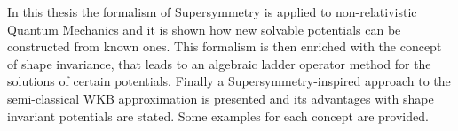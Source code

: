 \thispagestyle{intro}
In this thesis the formalism of Supersymmetry is applied to non-relativistic
Quantum Mechanics and it is shown how new solvable potentials can be
constructed from known ones. This formalism is then enriched with the concept
of shape invariance, that leads to an algebraic ladder operator method 
for the solutions of certain potentials. Finally a Supersymmetry-inspired
approach to the semi-classical WKB approximation is presented and its advantages
with shape invariant potentials are stated. Some examples for each concept are
provided.

